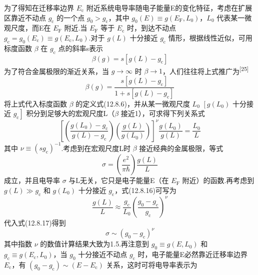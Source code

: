 为了得知在迁移率边界 $E_{\mathrm{c}}$ 附近系统电导率随电子能量E的变化特征，考虑在扩展区靠近不动点 $g_{\mathrm{c}}$ 的一个点 $g_{0}>g_{\mathrm{c}}$，其中 $g_{0}\left(E\right)\equiv g\left(E_{\mathrm{F}},L_{0}\right)$，$L_{0}$ 代表某一微观尺度，而E在 $E_{\mathrm{F}}$ 附近.当 $E_{\mathrm{F}}$ 等于 $E_{\mathrm{c}}$ 时，到达不动点 $g_{\mathrm{c}}=g_{0}\left(E_{\mathrm{c}}\right)\equiv g\left(E_{\mathrm{c}},L_{0}\right)$.对于 $g\left(L\right)$ 十分接近 $g_{\mathrm{c}}$ 情形，根据线性近似，可用标度函数 $\beta$ 在 $g_{\mathrm{c}}$ 点的斜率s表示
\begin{equation}
  \beta\left(g\right)=s\left[g\left(L\right)-g_{\mathrm{c}}\right]
\end{equation}
为了符合金属极限的渐近关系，当 $g\rightarrow\infty$ 时 $\beta\rightarrow1$，人们往往将上式推广为\textsuperscript{[25]}
\begin{equation}
  \beta\left(g\right)=\frac{s\left[g\left(L\right)-g_{\mathrm{c}}\right]}
  {1+s\left[g\left(L\right)-g_{\mathrm{c}}\right]}
\end{equation}
将上式代入标度函数 $\beta$ 的定义式(12.8.6)，并从某一微观尺度 $L_{0}$ $\left[g\left(L_{0}\right)\right.$ 十分接近 $\left.g_{\mathrm{c}}\right]$ 积分到足够大的宏观尺度L（$\beta$ 接近1），可求得下列关系式
\begin{equation}
  \left[\left(\frac{g\left(L_{0}\right)-g_{\mathrm{c}}}{g\left(L\right)-g_{\mathrm{c}}}\right)
  \left(\frac{g\left(L\right)}{g\left(L_{0}\right)}\right)\right]^{\nu}
  \frac{g\left(L_{0}\right)}{g\left(L\right)}=\frac{L_{0}}{L}
\end{equation}
其中 $\nu\equiv\left(sg_{\mathrm{c}}\right)^{-1}$.考虑到在宏观尺度L时 $\beta$ 接近经典的金属极限，等式
\begin{equation}
  \sigma=\left(\frac{e^{2}}{\pi\hbar}\right)\frac{g\left(L\right)}{L}
\end{equation}
成立，并且电导率 $\sigma$ 与L无关，它只是电子能量E（在 $E_{\mathrm{F}}$ 附近）的函数.再考虑到 $g\left(L\right)\gg g_{\mathrm{c}}$ 和 $g\left(L_{0}\right)$ 十分接近 $g_{\mathrm{c}}$，式(12.8.16)可写为
\begin{equation}
  \frac{g\left(L\right)}{L}\approx\frac{g_{\mathrm{c}}}{L_{0}}
  \left(\frac{g_{0}-g_{\mathrm{c}}}{g_{\mathrm{c}}}\right)^{\nu}
\end{equation}
代入式(12.8.17)得到
\begin{equation}
  \sigma\sim\left(g_{0}-g_{\mathrm{c}}\right)^{\nu}
\end{equation}
其中指数 $\nu$ 的数值计算结果大致为1.5.再注意到 $g_{0}\equiv g\left(E,L_{0}\right)$ 和 $g_{\mathrm{c}}\equiv g\left(E_{\mathrm{c}},L_{0}\right)$，当 $g_{0}$ 十分接近不动点 $g_{\mathrm{c}}$ 时，电子能量E必然靠近迁移率边界 $E_{\mathrm{c}}$，有 $\left(g_{0}-g_{\mathrm{c}}\right)\sim\left(E-E_{\mathrm{c}}\right)$ 关系，这时可将电导率表示为
